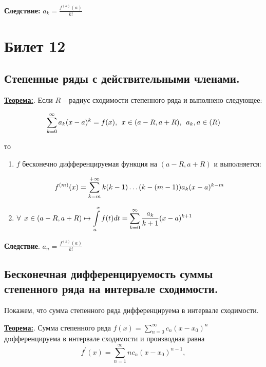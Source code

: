 \documentclass[a4paper,12pt]{article} %
\begin{document}
      \textbf{Следствие:}
      $a_k = \frac{f^{(k)}(a)}{k!}
	  $


\newpage
\section{Билет 12}

\subsection{Степенные ряды с действительными членами.}

\underline{\textbf{Теорема:}}. Если $R$ -- радиус сходимости степенного ряда и выполнено следующее:

\begin{equation*}
\Large \displaystyle \sum\limits_{k = 0}^{\infty} a_k(x-a)^k = f(x),\ x\in (a - R, a + R),\ a_k,a \in \mathbb(R)
\end{equation*}

то
\begin{enumerate}
\item $f$ бесконечно дифференцируемая функция на $(a-R,a+R)$ и  выполняется: 

\begin{equation*}
\Large \displaystyle f^{(m)}(x) = \sum\limits_{k = m}^{+\infty} k(k-1)\dots (k - (m-1))a_k(x-a)^{k-m}
\end{equation*}

\item $\Large \displaystyle \forall\ x \in (a - R, a + R) \mapsto \int\limits_{a}^{x} f(t)dt = \sum\limits_{k = 0}^{\infty} \frac{a_k}{k+1}(x-a)^{k+1}$ 

\end{enumerate} 

\textbf{Следствие}. $a_n = \frac{f^{(k)}(a)}{k!}$


\subsection{Бесконечная дифференцируемость суммы степенного ряда на интервале сходимости.}

Покажем, что сумма степенного ряда дифференцируема в интервале сходимости.

\underline{\textbf{Теорема:}}. Сумма степенного ряда $f(x)=\sum\limits_{n=0}^{\infty} c_{n}\left(x-x_{0}\right)^{n}$ дuфференцируема в интервале сходимости и производная равна
\begin{equation*}
f^{\prime}(x)=\sum\limits_{n=1}^{\infty} n c_{n}\left(x-x_{0}\right)^{n-1},
\end{equation*}
\end{document}
